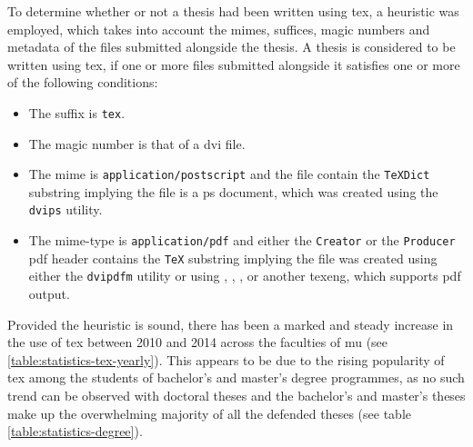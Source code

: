     To determine whether or not a thesis had been written using \gls{tex}, a heuristic was employed, which takes into account the \glspl{mime}, suffices, magic numbers and metadata of the files submitted alongside the thesis. A thesis is considered to be written using \gls{tex}, if one or more files submitted alongside it satisfies one or more of the following conditions:

    \begin{itemize}
      \item The suffix is \texttt{tex}.
      \item The magic number is that of a \acrshort{dvi} file.
      \item The \gls{mime} is \texttt{application/postscript} and the file contain the \texttt{TeXDict} substring implying the file is a \gls{ps} document, which was created using the \texttt{dvips} utility.
      \item The mime-type is \texttt{application/pdf} and either the \texttt{Creator} or the \texttt{Producer} \gls{pdf} header contains the \texttt{TeX} substring implying the file was created using either the \texttt{dvipdfm} utility or using , , ,  or another \gls{texeng}, which supports \gls{pdf} output.
    \end{itemize}

    Provided the heuristic is sound, there has been a marked and steady increase in the use of \gls{tex} between 2010 and 2014 across the faculties of \gls{mu} (see \ref{table:statistics-tex-yearly}). This appears to be due to the rising popularity of \gls{tex} among the students of bachelor's and master's degree programmes, as no such trend can be observed with doctoral theses and the bachelor's and master's theses make up the overwhelming majority of all the defended theses (see table \ref{table:statistics-degree}).


